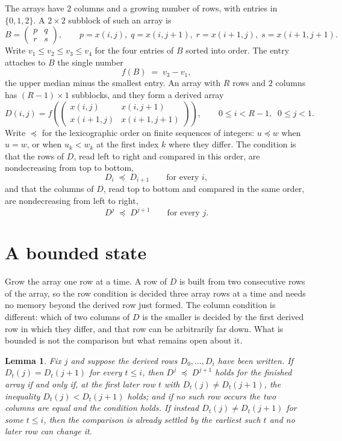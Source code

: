 \documentclass[11pt,a4paper]{article}
\theoremstyle{plain}
\newtheorem{lemma}[theorem]{Lemma}
\theoremstyle{definition}
\begin{document}
The arrays have $2$ columns and a growing number of rows, with entries in $\{0,1,2\}$. A
$2\times2$ subblock of such an array is
\[
B=\begin{pmatrix} p & q \\ r & s \end{pmatrix},
\qquad p=x(i,j),\; q=x(i,j+1),\; r=x(i+1,j),\; s=x(i+1,j+1).
\]
Write $v_1\le v_2\le v_3\le v_4$ for the four entries of $B$ sorted into order. The entry attaches to $B$ the single number
\[
f(B)\;=\;v_3-v_1,
\]
the upper median minus the smallest entry. An array with $R$ rows and $2$ columns has $(R-1)\times1$ subblocks, and they
form a derived array
\[
D(i,j)=f\!\left(\begin{pmatrix} x(i,j) & x(i,j+1) \\ x(i+1,j) & x(i+1,j+1)\end{pmatrix}
\right),\qquad 0\le i<R-1,\;\; 0\le j<1 .
\]
Write $\preceq$ for the lexicographic order on finite sequences of integers: $u\preceq w$ when
$u=w$, or when $u_k<w_k$ at the first index $k$ where they differ. The condition is that the
rows of $D$, read left to right and compared in this order, are nondecreasing from top to bottom,
\[
D_{i}\;\preceq\;D_{i+1}\qquad\text{for every } i,
\]
and that the columns of $D$, read top to bottom and compared in the same order, are nondecreasing
from left to right,
\[
D^{j}\;\preceq\;D^{j+1}\qquad\text{for every } j .
\]

\section{A bounded state}

Grow the array one row at a time. A row of $D$ is built from two consecutive rows of the array,
so the row condition is decided three array rows at a time and needs no memory beyond the
derived row just formed. The column condition is different: which of two columns of $D$ is the
smaller is decided by the first derived row in which they differ, and that row can be
arbitrarily far down. What is bounded is not the comparison but what remains open about it.

\begin{lemma}\label{lem:bits}
Fix $j$ and suppose the derived rows $D_0,\dots,D_i$ have been written. If $D_t(j)=D_t(j+1)$ for
every $t\le i$, then $D^{j}\;\preceq\;D^{j+1}$ holds for the finished array if and only if,
at the first later row $t$ with $D_t(j)\neq D_t(j+1)$, the inequality $D_t(j)<D_t(j+1)$
holds; and if no such row occurs the two columns are equal and the condition holds. If instead
$D_t(j)\neq D_t(j+1)$ for some $t\le i$, then the comparison is already settled by the earliest
such $t$ and no later row can change it.
\end{lemma}
\end{document}
